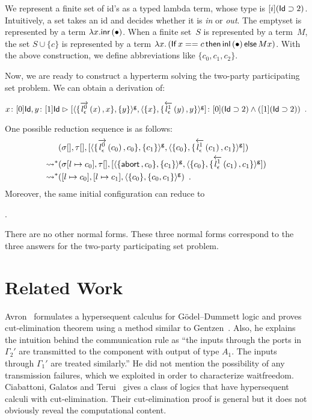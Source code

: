 We represent a finite set of id's as a
typed lambda term, whose type is $[i](\Id\supset 2)$.  Intuitively, a
set takes an id and decides whether it is \textit{in} or \textit{out}.
The emptyset is represented by a term $\lambda x. \linr {\bullet}$.  
When a finite set~$S$ is represented by a term~$M$,
the set $S \cup \{c\}$ is represented by a term
$\lambda x.\left(\ifte{x==c}{\linl {\bullet}}{Mx}\right)$.
With the above construction, we define abbreviations
like $\{c_0, c_1, c_2\}$.

Now, we are ready to construct a hyperterm solving the two-party
participating set problem.
We can  obtain a derivation of:
\begin{center}
 \small
$
 \tj{x}{[0]\Id},
 \tj{y}{[1]\Id}
 \tr
 \tj{\cotuple{\gpair{\{\ltor 0 l \epsilon x, x\}, \{y\}},
 \gpair{\{x\}, \{\rtol 1 l\epsilon y, y\}}
 }}
 {[0](\Id\supset 2)\wedge ([1](\Id\supset 2))}\enspace.$
\end{center}

One possible reduction sequence is as follows:
\begin{align*}
 & \conf{[]}{[]}
 {\cotuple{\gpair{\{\ltor 0 l \epsilon {c_0}, {c_0}\}, \{{c_1}\}},
 \gpair {\{{c_0}\}, \{\rtol 1 l\epsilon {c_1}, {c_1}\}}}} \\
 \reduction &
 \conf{[l\mapsto {c_0}]}{[]}
 {
 \cotuple{
 \gpair{\{\abort, {c_0}\}, \{{c_1}\}},
 \gpair{\{{c_0}\}, \{\rtol 1 l\epsilon {c_1}, {c_1}\}}
 }
 }
 \\
 \reduction &
 \concreteconf{[l\mapsto {c_0}]}{[l\mapsto {c_1}]}{\gpair{\{{c_0}\}, \{c_0, c_1\}}}\enspace.
\end{align*}
Moreover, the same initial configuration can reduce to
\begin{Equation*}
 \enspace. 
\end{Equation*}
There are no other normal forms.
These three normal forms correspond to the three answers for the
two-party participating set problem.

\section{Related Work}
\label{related}
Avron~\cite{avron91} formulates a
hypersequent calculus for G\"odel--Dummett logic and proves
cut-elimination theorem using a method
similar to Gentzen~\cite{gentzen}.
Also, he explains the intuition behind the communication rule as
``the inputs through the ports in $\Gamma_2'$ are transmitted to the
component with output of type $A_1.$  The inputs through $\Gamma_1'$ are
treated similarly.''  He did not mention the possibility of
any transmission failures, which we exploited
in order to characterize waitfreedom.
Ciabattoni, Galatos and Terui~\cite{alg} gives a class of logics
that have
hypersequent calculi with
cut-elimination.
Their cut-elimination proof is general but it does not
obviously reveal the computational content.

